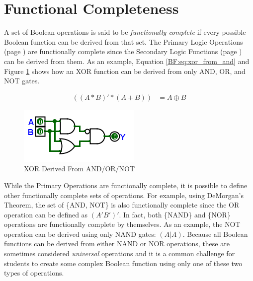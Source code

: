 \section{Functional Completeness}
\label{BF:sec:functional_completeness}

A set of Boolean operations is said to be \emph{functionally complete} if every possible Boolean function can be derived from that set. The Primary Logic Operations (page \pageref{BF:sec:primary_logic_operations}) are functionally complete since the Secondary Logic Functions (page \pageref{BF:sec:secondary_logic_functions}) can be derived from them. As an example, Equation \ref{BF:eq:xor_from_and} and Figure \ref{fig:04_33} shows how an \textsf{XOR} function can be derived from only \textsf{AND}, \textsf{OR}, and \textsf{NOT} gates.

\begin{align}
  \label{BF:eq:xor_from_and}
  ( (A * B)' * ( A + B) )  &= A \oplus B
\end{align}

\begin{figure}[H]
	\centering
	\includegraphics[width=\maxwidth{.95\linewidth}]{gfx/04_33}
	\caption{XOR Derived From AND/OR/NOT}
	\label{fig:04_33}
\end{figure}

While the Primary Operations are functionally complete, it is possible to define other functionally complete sets of operations. For example, using DeMorgan's Theorem, the set of \{\textsf{AND}, \textsf{NOT}\} is also functionally complete since the \textsf{OR}  operation can be defined as $ (A'B')' $. In fact, both \{\textsf{NAND}\} and \{NOR\} operations are functionally complete by themselves. As an example, the \textsf{NOT}  operation can be derived using only \textsf{NAND} gates: $ ( A | A ) $. Because all Boolean functions can be derived from either \textsf{NAND} or \textsf{NOR} operations, these are sometimes considered \emph{universal} operations and it is a common challenge for students to create some complex Boolean function using only one of these two types of operations.